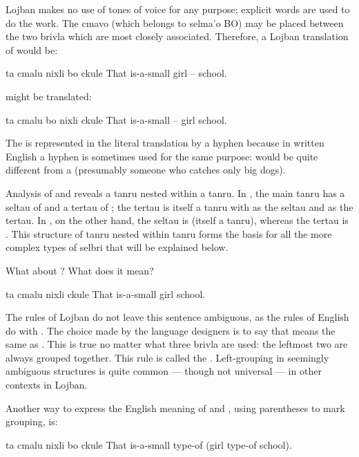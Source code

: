 Lojban makes no use of tones of voice for any purpose;
    explicit words are used to do the work. The cmavo  (which
    belongs to selma'o BO) may be placed between the two brivla
    which are most closely associated. Therefore, a Lojban
    translation of  would be:
\begin{example}
ta cmalu nixli bo ckule\n
That is-a-small girl -- school.
\end{example}

 might be translated:
\begin{example}
ta cmalu bo nixli ckule\n
That is-a-small -- girl school.
\end{example}

The  is represented in the literal translation by a
    hyphen because in written English a hyphen is sometimes used
    for the same purpose:  would be quite
    different from a  (presumably someone who
    catches only big dogs).

Analysis of  and  reveals a tanru nested within a
    tanru. In , the main tanru has a
    seltau of  and a tertau of ; the
    tertau is itself a tanru with  as the seltau and
     as the tertau. In , on
    the other hand, the seltau is  (itself a
    tanru), whereas the tertau is . This structure of
    tanru nested within tanru forms the basis for all the more
    complex types of selbri that will be explained below.

What about ? What does it
    mean?
\begin{example}
ta cmalu nixli ckule\n
That is-a-small girl school.
\end{example}

The rules of Lojban do not leave this sentence ambiguous, as
    the rules of English do with .
    The choice made by the language designers is to say that  means the same as . This is true no matter what three
    brivla are used: the leftmost two are always grouped together.
    This rule is called the . Left-grouping
    in seemingly ambiguous structures is quite common --- though
    not universal --- in other contexts in Lojban. 

Another way to express the English meaning of  and , using parentheses to mark grouping, is:
\begin{example}
ta cmalu nixli bo ckule\n
That is-a-small type-of (girl type-of school).
\end{example}

